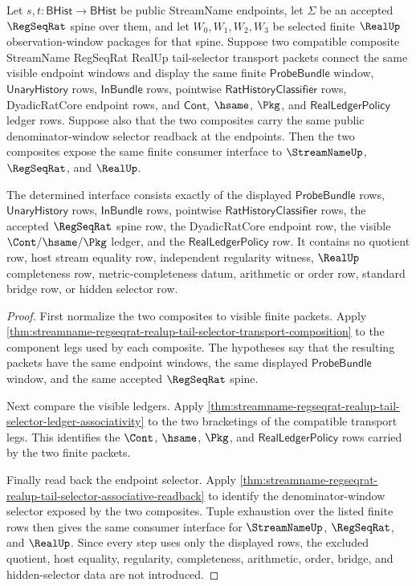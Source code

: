 \begin{theorem}
\label{thm:streamname-tail-selector-composite-transport-determinacy}
Let $s,t:\mathsf{BHist}\to\mathsf{BHist}$ be public StreamName endpoints, let
$\Sigma$ be an accepted $\RegSeqRat$ spine over them, and let
$W_0,W_1,W_2,W_3$ be selected finite $\RealUp$ observation-window packages for
that spine. Suppose two compatible composite StreamName RegSeqRat RealUp
tail-selector transport packets connect the same visible endpoint windows and
display the same finite $\mathsf{ProbeBundle}$ window, $\mathsf{UnaryHistory}$
rows, $\mathsf{InBundle}$ rows, pointwise
$\mathsf{RatHistoryClassifier}$ rows, DyadicRatCore endpoint rows, and
$\mathsf{Cont}$, $\hsame$, $\Pkg$, and $\mathsf{RealLedgerPolicy}$ ledger rows.
Suppose also that the two composites carry the same public denominator-window
selector readback at the endpoints. Then the two composites expose the same
finite consumer interface to $\StreamNameUp$, $\RegSeqRat$, and $\RealUp$.

The determined interface consists exactly of the displayed
$\mathsf{ProbeBundle}$ rows, $\mathsf{UnaryHistory}$ rows, $\mathsf{InBundle}$
rows, pointwise $\mathsf{RatHistoryClassifier}$ rows, the accepted
$\RegSeqRat$ spine row, the DyadicRatCore endpoint row, the visible
$\Cont/\hsame/\Pkg$ ledger, and the $\mathsf{RealLedgerPolicy}$ row. It contains
no quotient row, host stream equality row, independent regularity witness,
$\RealUp$ completeness row, metric-completeness datum, arithmetic or order row,
standard bridge row, or hidden selector row.
\end{theorem}
\begin{proof}
First normalize the two composites to visible finite packets. Apply
\autoref{thm:streamname-regseqrat-realup-tail-selector-transport-composition}
to the component legs used by each composite. The hypotheses say that the
resulting packets have the same endpoint windows, the same displayed
$\mathsf{ProbeBundle}$ window, and the same accepted $\RegSeqRat$ spine.

Next compare the visible ledgers. Apply
\autoref{thm:streamname-regseqrat-realup-tail-selector-ledger-associativity}
to the two bracketings of the compatible transport legs. This identifies the
$\Cont$, $\hsame$, $\Pkg$, and $\mathsf{RealLedgerPolicy}$ rows carried by the
two finite packets.

Finally read back the endpoint selector. Apply
\autoref{thm:streamname-regseqrat-realup-tail-selector-associative-readback}
to identify the denominator-window selector exposed by the two composites.
Tuple exhaustion over the listed finite rows then gives the same consumer
interface for $\StreamNameUp$, $\RegSeqRat$, and $\RealUp$. Since every step
uses only the displayed rows, the excluded quotient, host equality,
regularity, completeness, arithmetic, order, bridge, and hidden-selector data
are not introduced.
\end{proof}

